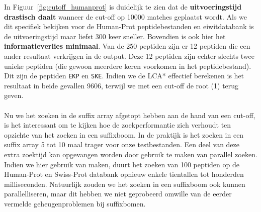 In Figuur~\ref{fig:cutoff_humanprot} is duidelijk te zien dat de \textbf{uitvoeringstijd drastisch daalt} wanneer de cut-off op 10000 matches geplaatst wordt.
Als we dit specifiek bekijken voor de Human-Prot peptidebestanden en eiwitdatabank is de uitvoeringstijd maar liefst 300 keer sneller.
Bovendien is ook hier het \textbf{informatieverlies minimaal}.
Van de 250 peptiden zijn er 12 peptiden die een ander resultaat verkrijgen in de output.
Deze 12 peptiden zijn echter slechts twee unieke peptiden (die gewoon meerdere keren voorkomen in het peptidebestand).
Dit zijn de peptiden \texttt{EKP} en \texttt{SKE}.
Indien we de LCA* effectief berekenen is het resultaat in beide gevallen 9606, terwijl we met een cut-off de root (1) terug geven.
\\ \\
Nu we het zoeken in de suffix array afgetopt hebben aan de hand van een cut-off, is het interessant om te kijken hoe de zoekperformantie zich verhoudt ten opzichte van het zoeken in een suffixboom.
In de praktijk is het zoeken in een suffix array 5 tot 10 maal trager voor onze testbestanden.
Een deel van deze extra zoektijd kan opgevangen worden door gebruik te maken van parallel zoeken.
Indien we hier gebruik van maken, duurt het zoeken van 100 peptiden op de Human-Prot en Swiss-Prot databank opnieuw enkele tientallen tot honderden milliseconden.
Natuurlijk zouden we het zoeken in een suffixboom ook kunnen parallelliseren, maar dit hebben we niet geprobeerd omwille van de eerder vermelde geheugenproblemen bij suffixbomen.

